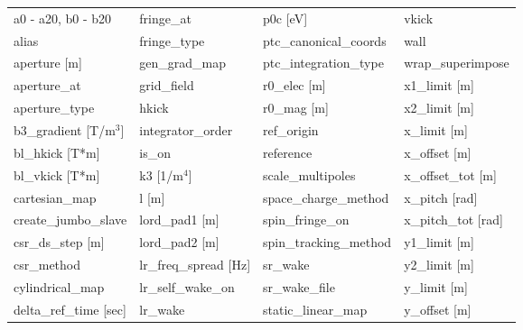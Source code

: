  \begin{tabular}{llll} \toprule
a0 - a20, b0 - b20               & fringe_at                        & p0c [eV]                         & vkick                            \\
alias                            & fringe_type                      & ptc_canonical_coords             & wall                             \\
aperture [m]                     & gen_grad_map                     & ptc_integration_type             & wrap_superimpose                 \\
aperture_at                      & grid_field                       & r0_elec [m]                      & x1_limit [m]                     \\
aperture_type                    & hkick                            & r0_mag [m]                       & x2_limit [m]                     \\
b3_gradient [T/m$^3$]            & integrator_order                 & ref_origin                       & x_limit [m]                      \\
bl_hkick [T*m]                   & is_on                            & reference                        & x_offset [m]                     \\
bl_vkick [T*m]                   & k3 [1/m$^4$]                     & scale_multipoles                 & x_offset_tot [m]                 \\
cartesian_map                    & l [m]                            & space_charge_method              & x_pitch [rad]                    \\
create_jumbo_slave               & lord_pad1 [m]                    & spin_fringe_on                   & x_pitch_tot [rad]                \\
csr_ds_step [m]                  & lord_pad2 [m]                    & spin_tracking_method             & y1_limit [m]                     \\
csr_method                       & lr_freq_spread [Hz]              & sr_wake                          & y2_limit [m]                     \\
cylindrical_map                  & lr_self_wake_on                  & sr_wake_file                     & y_limit [m]                      \\
delta_ref_time [sec]             & lr_wake                          & static_linear_map                & y_offset [m]                     \\

\end{tabular}
